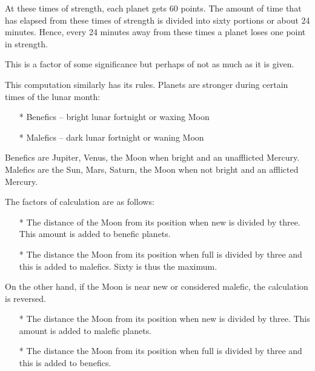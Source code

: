 At these times of strength, each planet gets 60 points. The amount of time that has elapsed from these times of strength is divided into sixty portions or about 24 minutes. Hence, every 24 minutes away from these times a planet loses one point in strength.

 

This is a factor of some significance but perhaps of not as much as it is given.

 


 

This computation similarly has its rules. Planets are stronger during certain times of the lunar month:

 

\begin{enumerate}
\item[*] Benefics – bright lunar fortnight or waxing Moon
\item[*] Malefics – dark lunar fortnight or waning Moon
 \end{enumerate}

Benefics are Jupiter, Venus, the Moon when bright and an unafflicted Mercury. Malefics are the Sun, Mars, Saturn, the Moon when not bright and an afflicted Mercury.

 

The factors of calculation are as follows:

\begin{enumerate}
\item[*] The distance of the Moon from its position when new is divided by three. This amount is added to benefic planets.
\item[*] The distance the Moon from its position when full is divided by three and this is added to malefics. Sixty is thus the maximum.
  \end{enumerate}

On the other hand, if the Moon is near new or considered malefic, the calculation is reversed.

\begin{enumerate}
\item[*] The distance the Moon from its position when new is divided by three. This amount is added to malefic planets.
\item[*] The distance the Moon from its position when full is divided by three and this is added to benefics.
  \end{enumerate}


